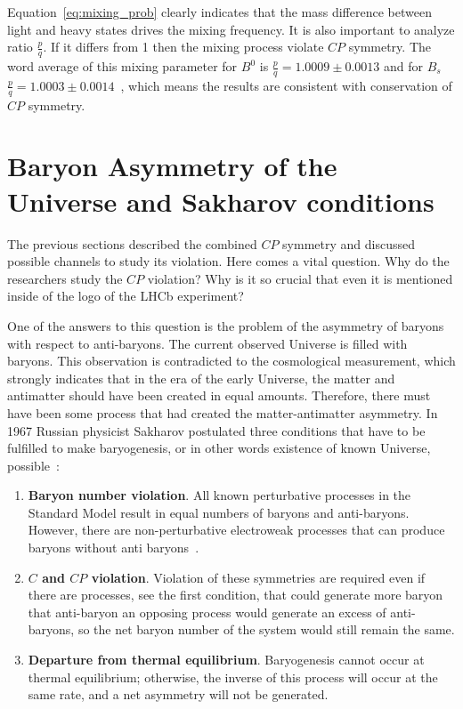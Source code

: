 Equation~\ref{eq:mixing_prob} clearly indicates that the mass difference between light and heavy states drives the mixing frequency. It is also important to analyze ratio $\frac{p}{q}$. If it differs from 1 then the mixing process violate $CP$ symmetry. The word average of this mixing parameter for $B^{0}$ is  $\frac{p}{q} = 1.0009 \pm 0.0013$ and  for $B_s$  $\frac{p}{q} = 1.0003 \pm 0.0014$~\cite{PDG}, which means the results are consistent with conservation of $CP$ symmetry. 

\section{Baryon Asymmetry of the Universe and Sakharov conditions}

The previous sections described the combined $CP$ symmetry and discussed possible channels to study its violation. Here comes a vital question. Why do the researchers study the $CP$ violation? Why is it so crucial that even it is mentioned inside of the logo of the LHCb experiment? 

One of the answers to this question is the problem of the asymmetry of baryons with respect to anti-baryons. The current observed Universe is filled with baryons.  This observation is contradicted to the cosmological measurement, which strongly indicates that in the era of the early Universe, the matter and antimatter should have been created in equal amounts. Therefore, there must have been some process that had created the matter-antimatter asymmetry.  
In 1967 Russian physicist Sakharov postulated three conditions that have to be fulfilled to make baryogenesis, or in other words existence of known Universe,  possible~\cite{sakharov}: 

\begin{enumerate}
    \item \textbf{Baryon number violation}.  All known perturbative processes in the Standard Model result in equal numbers of baryons and anti-baryons. However, there are non-perturbative electroweak processes that can produce baryons without anti baryons~\cite{bayron_number_violation}. 
    \item \textbf{$C$ and $CP$ violation}. Violation of these symmetries are required even if there are processes, see the first condition, that could generate more baryon that anti-baryon an opposing process would generate an excess of anti-baryons, so the net baryon number of the system would still remain the same.
    \item \textbf{Departure from thermal equilibrium}. Baryogenesis cannot occur at thermal equilibrium; otherwise, the inverse of this process will occur at the same rate, and a net asymmetry will not be generated.
\end{enumerate}

